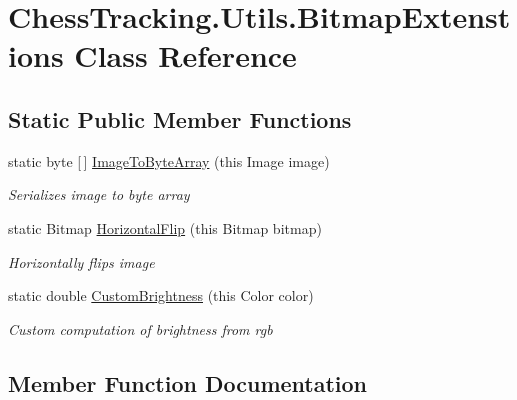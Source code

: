 \hypertarget{class_chess_tracking_1_1_utils_1_1_bitmap_extenstions}{}\section{Chess\+Tracking.\+Utils.\+Bitmap\+Extenstions Class Reference}
\label{class_chess_tracking_1_1_utils_1_1_bitmap_extenstions}
\subsection*{Static Public Member Functions}
\begin{DoxyCompactItemize}
\item 
static byte \mbox{[}$\,$\mbox{]} \mbox{\hyperlink{class_chess_tracking_1_1_utils_1_1_bitmap_extenstions_a92d1cea4ce86c497a45df4d600dda55e}{Image\+To\+Byte\+Array}} (this Image image)
\begin{DoxyCompactList}\small\item\em Serializes image to byte array \end{DoxyCompactList}\item 
static Bitmap \mbox{\hyperlink{class_chess_tracking_1_1_utils_1_1_bitmap_extenstions_a3435b380d308ad992afa5e1cf5bdb7a1}{Horizontal\+Flip}} (this Bitmap bitmap)
\begin{DoxyCompactList}\small\item\em Horizontally flips image \end{DoxyCompactList}\item 
static double \mbox{\hyperlink{class_chess_tracking_1_1_utils_1_1_bitmap_extenstions_a0dc112f2c8ed2c7339fdb1ad72c42bb1}{Custom\+Brightness}} (this Color color)
\begin{DoxyCompactList}\small\item\em Custom computation of brightness from rgb \end{DoxyCompactList}\end{DoxyCompactItemize}


\subsection{Member Function Documentation}
\mbox{\label{class_chess_tracking_1_1_utils_1_1_bitmap_extenstions_a0dc112f2c8ed2c7339fdb1ad72c42bb1}} 

